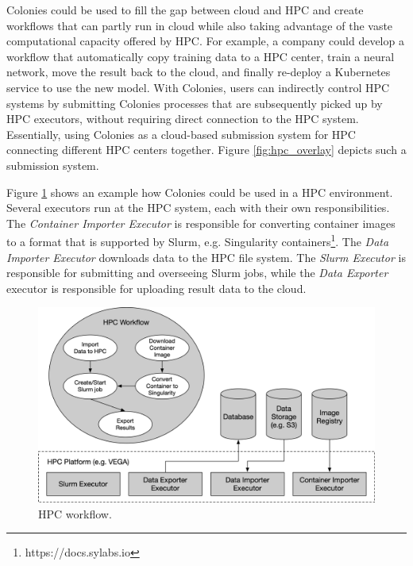 \documentclass{article}
\begin{document}
Colonies could be used to fill the gap between cloud and HPC and create workflows that can partly run in cloud while also taking advantage of the vaste computational capacity offered by HPC. For example, a company could develop a workflow that automatically copy training data to a HPC center, train a neural network, move the result back to the cloud, and finally re-deploy a Kubernetes service to use the new model. With Colonies, users can indirectly control HPC systems by submitting Colonies processes that are subsequently picked up by HPC executors, without requiring direct connection to the HPC system. Essentially, using Colonies as a cloud-based submission system for HPC connecting different HPC centers together. Figure \ref{fig:hpc_overlay} depicts such a submission system.

Figure \ref{fig:hpc_workflow} shows an example how Colonies could be used in a HPC environment. Several executors run at the HPC system, each with their own responsibilities. The \emph{Container Importer Executor} is responsible for converting container images to a format that is supported by Slurm, e.g. Singularity containers\footnote{https://docs.sylabs.io}. The \emph{Data Importer Executor} downloads data to the HPC file system. The \emph{Slurm Executor} is responsible for submitting and overseeing Slurm jobs, while the \emph{Data Exporter} executor is responsible for uploading result data to the cloud.

\begin{figure}[h]
	\centering
    \includegraphics[scale=0.43]{hpc_workflow.png}
	\caption{HPC workflow.}
	\label{fig:hpc_workflow}
\end{figure}
\end{document}
